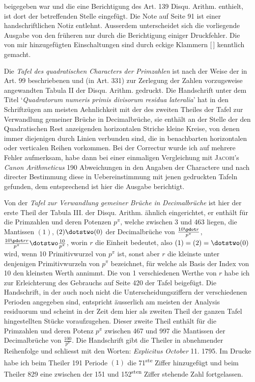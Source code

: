 beigegeben war und die eine Berichtigung des Art. 139 Disqu. Arithm. enthielt, ist dort der betreffenden Stelle eingefügt. Die Note auf Seite 91 ist einer handschriftlichen Notiz entlehnt. Ausserdem unterscheidet sich die vorliegende Ausgabe von den früheren nur durch die Berichtigung einiger Druckfehler. Die von mir hinzugefügten Einschaltungen sind durch eckige Klammern [\,] kenntlich gemacht.
\par Die \textit{Tafel des quadratischen Characters der Primzahlen} ist nach der Weise der in Art. 99 beschriebenen und (in Art. 331) zur Zerlegung der Zahlen vorzugsweise angewandten Tabula II der Disqu. Arithm. gedruckt. Die Handschrift unter dem Titel ‘\textit{Quadratorum numeris primis divisorum residua lateralia}’ hat in den Schriftzügen am meisten Aehnlichkeit mit der des zweiten Theiles der Tafel zur Verwandlung gemeiner Brüche in Decimalbrüche, sie enthält an der Stelle der den Quadratischen Rest anzeigenden horizontalen Striche kleine Kreise, von denen immer diejenigen durch Linien verbunden sind, die in benachbarten horizontalen oder verticalen Reihen vorkommen. Bei der Correctur wurde ich auf mehrere Fehler aufmerksam, habe dann bei einer einmaligen Vergleichung mit \textsc{Jacobi}’s \textit{Canon Arithmeticus} 190 Abweichungen in den Angaben der Charactere und nach directer Bestimmung diese in Uebereinstimmung mit jenen gedruckten Tafeln gefunden, dem entsprechend ist hier die Ausgabe berichtigt.
\par Von der \textit{Tafel zur Verwandlung gemeiner Brüche in Decimalbrüche} ist hier der erste Theil der Tabula III. der Disqu. Arithm. ähnlich eingerichtet, er enthält für die Primzahlen und deren Potenzen $p^\pi$, welche zwischen 3 und 463 liegen, die Mantissen $(1)$, $(2)\dotstwo(0)$ der Decimalbrüche von $\frac{10\pdot r}{p^\pi}$, $\frac{10\pdot rr}{p^\pi}\dotstwo\frac{10}{p^\pi}$, worin $r$ die Einheit bedeutet, also $(1)=(2)=\dotstwo(0)$ wird, wenn 10 Primitivwurzel von $p^\pi$ ist, sonst aber $r$ die kleinste unter denjenigen Primitivwurzeln von $p^\pi$ bezeichnet, für welche als Basis der Index von 10 den kleinsten Werth annimmt. Die von 1 verschiedenen Werthe von $r$ habe ich zur Erleichterung des Gebrauchs auf Seite 420 der Tafel beigefügt. Die Handschrift, in der auch noch nicht die Unterscheidungsziffern der verschiedenen Perioden angegeben sind, entspricht äusserlich am meisten der Analysis residuorum und scheint in der Zeit dem hier als zweiten Theil der ganzen Tafel hingestellten Stücke voraufzugehen.
Dieser zweite Theil enthält für die Primzahlen und deren Potenz $p^\pi$ zwischen 467 und 997 die Mantissen der Decimalbrüche von $\frac{100}{p^\pi}$. Die Handschrift gibt die Theiler in abnehmender Reihenfolge und schliesst mit den Worten: \textit{Explicitus October} 11. 1795. Im Drucke habe ich beim Theiler 191 Periode $(1)$ die 71\textsuperscript{ste} Ziffer hinzugefügt und beim Theiler 829 eine zwischen der 151 und 152\textsuperscript{sten} Ziffer stehende Zahl fortgelassen.
